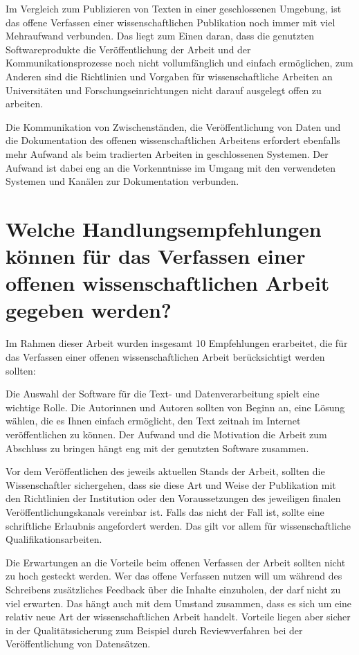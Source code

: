 Im Vergleich zum Publizieren von Texten in einer geschlossenen Umgebung, ist das offene Verfassen einer wissenschaftlichen Publikation noch immer mit viel Mehraufwand verbunden. Das liegt zum Einen daran, dass die genutzten Softwareprodukte die Veröffentlichung der Arbeit und der Kommunikationsprozesse noch nicht vollumfänglich und einfach ermöglichen, zum Anderen sind die Richtlinien und Vorgaben für wissenschaftliche Arbeiten an Universitäten und Forschungseinrichtungen nicht darauf ausgelegt offen zu arbeiten.

Die Kommunikation von Zwischenständen, die Veröffentlichung von Daten und die Dokumentation des offenen wissenschaftlichen Arbeitens erfordert ebenfalls mehr Aufwand als beim tradierten Arbeiten in geschlossenen Systemen. Der Aufwand ist dabei eng an die Vorkenntnisse im Umgang mit den verwendeten Systemen und Kanälen zur Dokumentation verbunden.

\section{Welche Handlungsempfehlungen können für das Verfassen einer offenen wissenschaftlichen Arbeit gegeben werden?}

Im Rahmen dieser Arbeit wurden insgesamt 10 Empfehlungen erarbeitet, die für das Verfassen einer offenen wissenschaftlichen Arbeit berücksichtigt werden sollten:

Die Auswahl der Software für die Text- und Datenverarbeitung spielt eine wichtige Rolle. Die Autorinnen und Autoren sollten von Beginn an, eine Lösung wählen, die es Ihnen einfach ermöglicht, den Text zeitnah im Internet veröffentlichen zu können. Der Aufwand und die Motivation die Arbeit zum Abschluss zu bringen hängt eng mit der genutzten Software zusammen.

Vor dem Veröffentlichen des jeweils aktuellen Stands der Arbeit, sollten die Wissenschaftler sichergehen, dass sie diese Art und Weise der Publikation mit den Richtlinien der Institution oder den Voraussetzungen des jeweiligen finalen Veröffentlichungskanals vereinbar ist. Falls das nicht der Fall ist, sollte eine schriftliche Erlaubnis angefordert werden. Das gilt vor allem für wissenschaftliche Qualifikationsarbeiten.

Die Erwartungen an die Vorteile beim offenen Verfassen der Arbeit sollten nicht zu hoch gesteckt werden. Wer das offene Verfassen nutzen will um während des Schreibens zusätzliches Feedback über die Inhalte einzuholen, der darf nicht zu viel erwarten. Das hängt auch mit dem Umstand zusammen, dass es sich um eine relativ neue Art der wissenschaftlichen Arbeit handelt. Vorteile liegen aber sicher in der Qualitätssicherung zum Beispiel durch Reviewverfahren bei der Veröffentlichung von Datensätzen.
